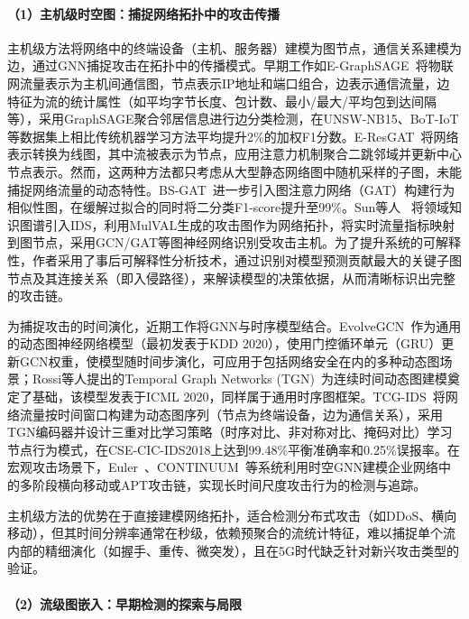 \paragraph{（1）主机级时空图：捕捉网络拓扑中的攻击传播}


主机级方法将网络中的终端设备（主机、服务器）建模为图节点，通信关系建模为边，通过GNN捕捉攻击在拓扑中的传播模式。早期工作如E-GraphSAGE~\cite{lo2022egraphsage}将物联网流量表示为主机间通信图，节点表示IP地址和端口组合，边表示通信流量，边特征为流的统计属性（如平均字节长度、包计数、最小/最大/平均包到达间隔等），采用GraphSAGE聚合邻居信息进行边分类检测，在UNSW-NB15、BoT-IoT等数据集上相比传统机器学习方法平均提升2\%的加权F1分数。E-ResGAT~\cite{E-ResGAT}将网络表示转换为线图，其中流被表示为节点，应用注意力机制聚合二跳邻域并更新中心节点表示。然而，这两种方法都只考虑从大型静态网络图中随机采样的子图，未能捕捉网络流量的动态特性。BS-GAT~\cite{wang2025bsgat}进一步引入图注意力网络（GAT）构建行为相似性图，在缓解过拟合的同时将二分类F1-score提升至99\%。Sun等人~\cite{sun2024gnnids} 将领域知识图谱引入IDS，利用MulVAL生成的攻击图作为网络拓扑，将实时流量指标映射到图节点，采用GCN/GAT等图神经网络识别受攻击主机。为了提升系统的可解释性，作者采用了事后可解释性分析技术，通过识别对模型预测贡献最大的关键子图节点及其连接关系（即入侵路径），来解读模型的决策依据，从而清晰标识出完整的攻击链。

为捕捉攻击的时间演化，近期工作将GNN与时序模型结合。EvolveGCN~\cite{EvolveGCN}作为通用的动态图神经网络模型（最初发表于KDD 2020），使用门控循环单元（GRU）更新GCN权重，使模型随时间步演化，可应用于包括网络安全在内的多种动态图场景；Rossi等人提出的Temporal Graph Networks (TGN)~\cite{TGN}为连续时间动态图建模奠定了基础，该模型发表于ICML 2020，同样属于通用时序图框架。TCG-IDS~\cite{TCG-IDS}将网络流量按时间窗口构建为动态图序列（节点为终端设备，边为通信关系），采用TGN编码器并设计三重对比学习策略（时序对比、非对称对比、掩码对比）学习节点行为模式，在CSE-CIC-IDS2018上达到99.48\%平衡准确率和0.25\%误报率。在宏观攻击场景下，Euler~\cite{king2023euler}、CONTINUUM~\cite{bahar2025continuum}等系统利用时空GNN建模企业网络中的多阶段横向移动或APT攻击链，实现长时间尺度攻击行为的检测与追踪。

主机级方法的优势在于直接建模网络拓扑，适合检测分布式攻击（如DDoS、横向移动），但其时间分辨率通常在秒级，依赖预聚合的流统计特征，难以捕捉单个流内部的精细演化（如握手、重传、微突发），且在5G时代缺乏针对新兴攻击类型的验证。

\paragraph{（2）流级图嵌入：早期检测的探索与局限}


